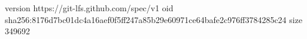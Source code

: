 version https://git-lfs.github.com/spec/v1
oid sha256:8176d7bc01dc4a16aef0f5ff247a85b29e60971ce64bafe2c976ff3784285c24
size 349692
